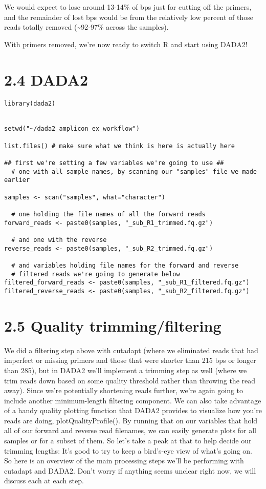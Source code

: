 \documentclass[
]{book}
\begin{document}
We would expect to lose around 13-14\% of bps just for cutting off the primers, and the remainder of lost bps would be from the relatively low percent of those reads totally removed (\textasciitilde92-97\% across the samples).

With primers removed, we're now ready to switch R and start using DADA2!

\hypertarget{dada2}{%
\section{2.4 DADA2}\label{dada2}}

\begin{verbatim}
library(dada2)


setwd("~/dada2_amplicon_ex_workflow")

list.files() # make sure what we think is here is actually here

## first we're setting a few variables we're going to use ##
  # one with all sample names, by scanning our "samples" file we made earlier
  
samples <- scan("samples", what="character")

  # one holding the file names of all the forward reads
forward_reads <- paste0(samples, "_sub_R1_trimmed.fq.gz")

  # and one with the reverse
reverse_reads <- paste0(samples, "_sub_R2_trimmed.fq.gz")

  # and variables holding file names for the forward and reverse
  # filtered reads we're going to generate below
filtered_forward_reads <- paste0(samples, "_sub_R1_filtered.fq.gz")
filtered_reverse_reads <- paste0(samples, "_sub_R2_filtered.fq.gz")
\end{verbatim}

\hypertarget{quality-trimmingfiltering}{%
\section{2.5 Quality trimming/filtering}\label{quality-trimmingfiltering}}

We did a filtering step above with cutadapt (where we eliminated reads that had imperfect or missing primers and those that were shorter than 215 bps or longer than 285), but in DADA2 we'll implement a trimming step as well (where we trim reads down based on some quality threshold rather than throwing the read away). Since we're potentially shortening reads further, we're again going to include another minimum-length filtering component. We can also take advantage of a handy quality plotting function that DADA2 provides to visualize how you're reads are doing, plotQualityProfile(). By running that on our variables that hold all of our forward and reverse read filenames, we can easily generate plots for all samples or for a subset of them. So let's take a peak at that to help decide our trimming lengths: It's good to try to keep a bird's-eye view of what's going on. So here is an overview of the main processing steps we'll be performing with cutadapt and DADA2. Don't worry if anything seems unclear right now, we will discuss each at each step.
\end{document}
